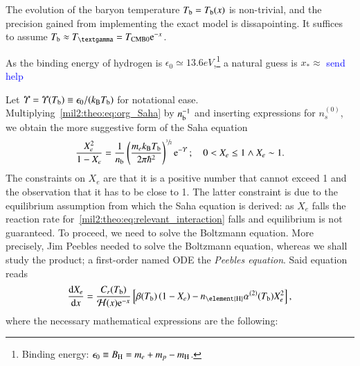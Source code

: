     The evolution of the baryon temperature $T_\mathrm{b}=T_\mathrm{b}(x)$ is non-trivial, and the precision gained from implementing the exact model is dissapointing. It suffices to assume $T\ped{b}\approx T\gped{\textgamma} = \TCMB \eu^{-x}$.~\citep{Callin2006}
    
    As the binding energy of hydrogen is $\epsilon_0 \simeq 13.6\unit{eV}$,\footnote{Binding energy: $\epsilon_0\equiv B_\mathrm{H}=m_e + m_p - m_\mathrm{H}$.} a natural guess is $x_* \approx $ \textcolor{blue}{send help}

    \sendhelp

    
    Let $\varUpsilon= \varUpsilon(T_\mathrm{b})\equiv \epsilon_0/(k_\mathrm{B} T_\mathrm{b} )$ for notational ease. Multiplying~\cref{mil2:theo:eq:org_Saha} by $n_\mathrm{b}^{-1}$ and inserting expressions for $n_s^{(0)}$, we obtain the more suggestive form of the Saha equation
    \begin{equation}\label{mil2:theo:eq:Saha}
        \frac{X_e^2}{1-X_e}= \frac{1}{n_\mathrm{b}}\left(\frac{m_e k_\mathrm{B} T_\mathrm{b}}{2\pi \hbar^2} \right)^{\sfrac{3}{2}} \mathrm{e}^{-\varUpsilon}\,; \quad   0 < X_e \leq 1 \wedge X_e\sim 1.
    \end{equation}
    The constraints on $X_e$ are that it is a positive number that cannot exceed 1 and the observation that it has to be close to 1. The latter constraint is due to the equilibrium assumption from which the Saha equation is derived: as $X_e$ falls the reaction rate for~\cref{mil2:theo:eq:relevant_interaction} falls and equilibrium is not guaranteed. To proceed, we need to solve the Boltzmann equation. More precisely, Jim Peebles needed to solve the Boltzmann equation, whereas we shall study the product; a first-order named ODE the \textit{Peebles equation}. Said equation reads
    \begin{equation}\label{mil2:theo:eq:Peebles}
        \dv{X_e}{x} = \frac{C_r(T\ped{b})}{\Hp(x)\eu^{-x}} \left[ \beta(T\ped{b}) \left(1-X_e\right) - n\ped{\element{H}} \alpha^{(2)}(T\ped{b})X_e^2 \right],
    \end{equation}
    where the necessary mathematical expressions are the following:
